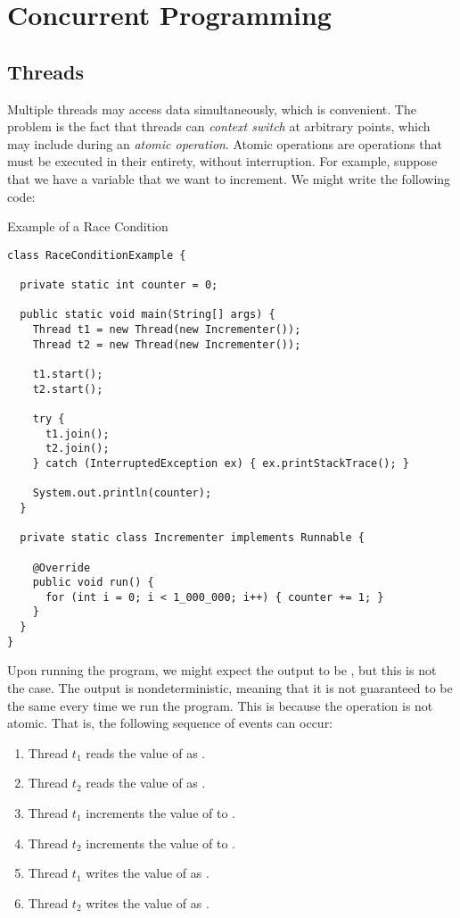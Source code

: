 \section{Concurrent Programming}

\subsection*{Threads}

\example Multiple threads may access data simultaneously, which is convenient. The problem is the fact that threads can \textit{context switch} at arbitrary points, which may include during an \textit{atomic operation}. Atomic operations are operations that must be executed in their entirety, without interruption. For example, suppose that we have a variable  that we want to increment. We might write the following code:

\begin{cl}{Example of a Race Condition}
\begin{lstlisting}[language=MyJava]
class RaceConditionExample {

  private static int counter = 0;

  public static void main(String[] args) {
    Thread t1 = new Thread(new Incrementer());
    Thread t2 = new Thread(new Incrementer());

    t1.start();
    t2.start();

    try {
      t1.join();
      t2.join();
    } catch (InterruptedException ex) { ex.printStackTrace(); }
    
    System.out.println(counter);
  }

  private static class Incrementer implements Runnable {

    @Override
    public void run() {
      for (int i = 0; i < 1_000_000; i++) { counter += 1; }
    }
  }
}
\end{lstlisting}
\end{cl}

Upon running the program, we might expect the output to be , but this is not the case. The output is nondeterministic, meaning that it is not guaranteed to be the same every time we run the program. This is because the  operation is not atomic. That is, the following sequence of events can occur:

\begin{enumerate}
  \item Thread $t_1$ reads the value of  as .
  \item Thread $t_2$ reads the value of  as .
  \item Thread $t_1$ increments the value of  to .
  \item Thread $t_2$ increments the value of  to .
  \item Thread $t_1$ writes the value of  as .
  \item Thread $t_2$ writes the value of  as .
\end{enumerate}

